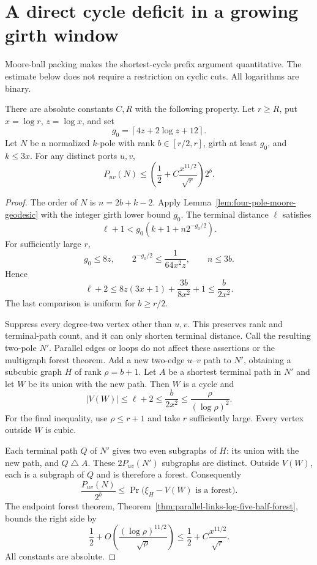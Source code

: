 \section{A direct cycle deficit in a growing girth window}
\label{sec:random-girth-window}

Moore-ball packing makes the shortest-cycle prefix argument quantitative.
The estimate below does not require a restriction on cyclic cuts.
All logarithms are binary.

\begin{lemma}
\label{lem:random-girth-prefix-path}
There are absolute constants $C,R$ with the following property.
Let $r\ge R$, put $x=\log r$, $z=\log x$, and set
\[
 g_0=\left\lceil4z+2\log z+12\right\rceil.
\]
Let $N$ be a normalized $k$-pole with rank $b\in[r/2,r]$, girth at least $g_0$, and $k\le3x$.
For any distinct ports $u,v$,
\[
 P_{uv}(N)\le
 \left(\frac12+C\frac{x^{11/2}}{\sqrt r}\right)2^b.
\]
\end{lemma}

\begin{proof}
The order of $N$ is $n=2b+k-2$.
Apply Lemma~\ref{lem:four-pole-moore-geodesic} with the integer girth lower bound $g_0$.
The terminal distance $\ell$ satisfies
\[
 \ell+1<g_0\left(k+1+n2^{-g_0/2}\right).
\]
For sufficiently large $r$,
\[
 g_0\le8z,\qquad
 2^{-g_0/2}\le\frac1{64x^2z},\qquad
 n\le3b.
\]
Hence
\[
 \ell+2\le8z(3x+1)+\frac{3b}{8x^2}+1
 \le\frac{b}{2x^2}.
\]
The last comparison is uniform for $b\ge r/2$.

Suppress every degree-two vertex other than $u,v$.
This preserves rank and terminal-path count, and it can only shorten terminal distance.
Call the resulting two-pole $N'$.
Parallel edges or loops do not affect these assertions or the multigraph forest theorem.
Add a new two-edge $u$--$v$ path to $N'$, obtaining a subcubic graph $H$ of rank $\rho=b+1$.
Let $A$ be a shortest terminal path in $N'$ and let $W$ be its union with the new path.
Then $W$ is a cycle and
\[
 |V(W)|\le\ell+2\le\frac{b}{2x^2}
 \le\frac{\rho}{(\log\rho)^2}.
\]
For the final inequality, use $\rho\le r+1$ and take $r$ sufficiently large.
Every vertex outside $W$ is cubic.

Each terminal path $Q$ of $N'$ gives two even subgraphs of $H$:
its union with the new path, and $Q\mathbin{\triangle}A$.
These $2P_{uv}(N')$ subgraphs are distinct.
Outside $V(W)$, each is a subgraph of $Q$ and is therefore a forest.
Consequently
\[
 \frac{P_{uv}(N)}{2^b}
 \le
 \Pr\bigl(\xi_H-V(W)\text{ is a forest}\bigr).
\]
The endpoint forest theorem, Theorem~\ref{thm:parallel-links-log-five-half-forest}, bounds the right side by
\[
 \frac12+O\!\left(\frac{(\log\rho)^{11/2}}{\sqrt\rho}\right)
 \le\frac12+C\frac{x^{11/2}}{\sqrt r}.
\]
All constants are absolute.
\end{proof}

